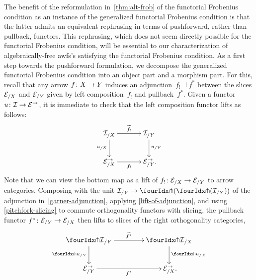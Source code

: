 \documentclass[reqno,10pt,a4paper,oneside,draft]{amsart}
\begin{document}
{{The benefit of the reformulation  in~\cref{thm:alt-frob} of the functorial Frobenius condition as an instance of the generalized functorial Frobenius condition  is that the latter admits an equivalent rephrasing in terms of pushforward, rather than pullback, functors.
This rephrasing, which does not seem directly possible for the functorial Frobenius condition, will be essential to our characterization of algebraically-free awfs's satisfying the functorial Frobenius condition.
As a first step towards the pushforward formulation, we decompose the generalized functorial Frobenius condition into an object part and a morphism part.
For this, recall that any arrow $f \co X \to Y$ induces an adjunction~$f_{!} \dashv f^*$ between the slices $\cal{E}_{/X}$ and $\cal{E}_{/Y}$ given by left composition~$f_{!}$ and pullback~$f^*$.
Given a functor $u \co \cal{I} \to \catE^\to$, it is immediate to check that the left composition functor lifts as follows:
\[
\xymatrix@C+1em{
  \cal{I}_{/X}
  \ar[r]^-{\widetilde{f_!}}
  \ar[d]_{u_{/X}}
&
  \cal{I}_{/Y}
  \ar[d]^{u_{/Y}}
\\
  \calE_{/X}^\to
  \ar[r]_-{f_!}
&
  \calE_{/Y}^\to
\rlap{.}}
\]
Note that we can view the bottom map as a lift of $f_! \co \cal{E}_{/X} \to \cal{E}_{/Y}$ to arrow categories.
Composing with the unit $\cal{I}_{/Y} \to \liftl{(\liftr{(\cal{I}_{/Y})})}$ of the adjunction in~\eqref{garner-adjunction}, applying \cref{lift-of-adjunction}, and using \cref{pitchfork-slicing} to commute orthogonality functors with slicing, the pullback functor $f^* \co \catE_{/Y} \to \catE_{/X}$ then lifts to slices of the right orthogonality categories,
\[
\xymatrix@C=1.5cm{
  \liftr{\cal{I}}_{/Y}
  \ar[d]_{{\liftr{u}}_{/Y}}
  \ar[r]^{\widetilde{f^*}}
&
  \liftr{\cal{I}}_{/X}
  \ar[d]^{{\liftr{u}}_{/X}}
\\
  {\catE}_{/Y}^\to
  \ar[r]_{f^*}
&
  \catE_{/X}^\to
\rlap{.}}
\]

}}
\end{document}

